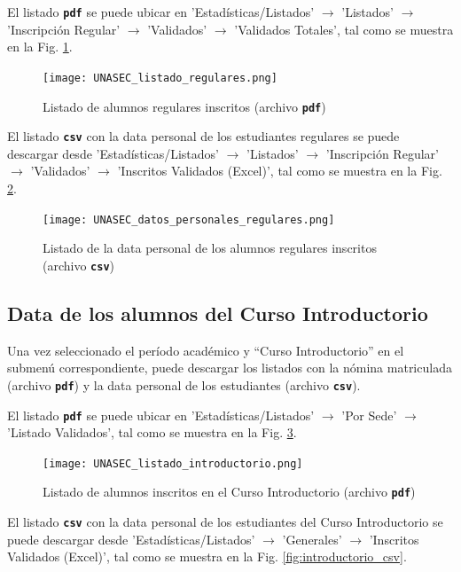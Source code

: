 \documentclass[letterpaper,12pt]{book}
\newcommand{\fileformat}[1]{\textbf{\texttt{#1}}}
\begin{document}
El listado \fileformat{pdf} se puede ubicar en 'Estadísticas/Listados' $\rightarrow$ 'Listados' $\rightarrow$ 'Inscripción Regular' $\rightarrow$ 'Validados' $\rightarrow$ 'Validados Totales', tal como se muestra en la Fig. \ref{fig:regulares_pdf}.

\begin{figure}[!ht]
  \centering
  \texttt{[image: UNASEC\_listado\_regulares.png]}
  \caption{Listado de alumnos regulares inscritos (archivo \fileformat{pdf})}
  \label{fig:regulares_pdf}
\end{figure}

El listado \fileformat{csv} con la data personal de los estudiantes regulares se puede descargar desde 'Estadísticas/Listados' $\rightarrow$ 'Listados' $\rightarrow$ 'Inscripción Regular' $\rightarrow$ 'Validados' $\rightarrow$ 'Inscritos Validados (Excel)', tal como se muestra en la Fig. \ref{fig:regulares_csv}.

\begin{figure}[!ht]
  \centering
  \texttt{[image: UNASEC\_datos\_personales\_regulares.png]}
  \caption{Listado de la data personal de los alumnos regulares inscritos (archivo \fileformat{csv})}
  \label{fig:regulares_csv}
\end{figure}

\FloatBarrier

\subsection{Data de los alumnos del Curso Introductorio}
Una vez seleccionado el período académico y ``Curso Introductorio'' en el submenú correspondiente, puede descargar los listados con la nómina matriculada (archivo \fileformat{pdf}) y la data personal de los estudiantes (archivo \fileformat{csv}).

El listado \fileformat{pdf} se puede ubicar en 'Estadísticas/Listados' $\rightarrow$ 'Por Sede' $\rightarrow$ 'Listado Validados', tal como se muestra en la Fig. \ref{fig:introductorio_pdf}.

\begin{figure}[!ht]
  \centering
  \texttt{[image: UNASEC\_listado\_introductorio.png]}
  \caption{Listado de alumnos inscritos en el Curso Introductorio (archivo \fileformat{pdf})}
  \label{fig:introductorio_pdf}
\end{figure}

El listado \fileformat{csv} con la data personal de los estudiantes del Curso Introductorio se puede descargar desde 'Estadísticas/Listados' $\rightarrow$ 'Generales' $\rightarrow$ 'Inscritos Validados (Excel)', tal como se muestra en la Fig. \ref{fig:introductorio_csv}.
\end{document}
